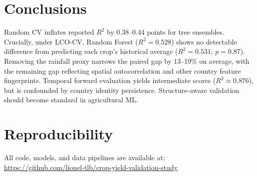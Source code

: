 \documentclass[conference]{IEEEtran}
\begin{document}
\begin{table}[h]
\centering
\caption{Effect of Removing Rainfall (Paired gap change after ablation)}
\end{table}

\section{Conclusions}

Random CV inflates reported $R^2$ by 0.38--0.44 points for tree ensembles. 
Crucially, under LCO-CV, Random Forest ($R^2 = 0.528$) shows no detectable difference 
from predicting each crop's historical average ($R^2 = 0.531$; $p = 0.87$). 
Removing the rainfall proxy narrows the paired gap by 13--19\% on average, with the 
remaining gap reflecting spatial autocorrelation and other country feature fingerprints. 
Temporal forward evaluation yields intermediate scores ($R^2 \approx 0.876$), but 
is confounded by country identity persistence. Structure-aware validation should 
become standard in agricultural ML.

\section*{Reproducibility}
All code, models, and data pipelines are available at:\\
\url{https://github.com/lionel-tlb/crop-yield-validation-study}



\end{document}
